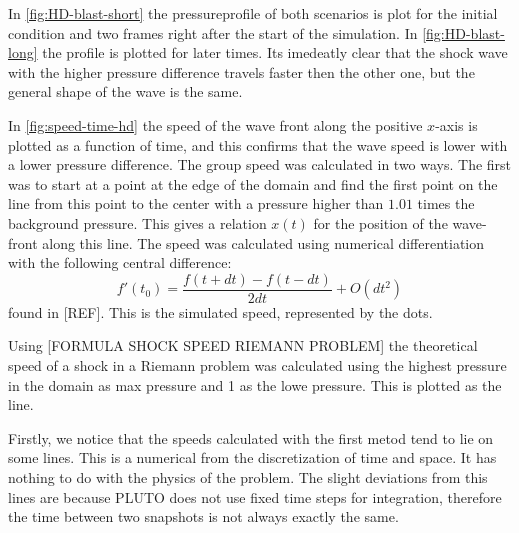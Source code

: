 In \cref{fig:HD-blast-short} the pressureprofile of both scenarios is plot for the initial condition and two frames right after the start of the simulation.
In \cref{fig:HD-blast-long} the profile is plotted for later times.
Its imedeatly clear that the shock wave with the higher pressure difference travels faster then the other one, but the general shape of the wave is the same.



In \cref{fig:speed-time-hd} the speed of the wave front along the positive $x$-axis is plotted as a function of time, and this confirms that the wave speed is lower with a lower pressure difference.
The group speed was calculated in two ways. The first was to start at a point at the edge of the domain and find the first point on the line from this point to the center with a pressure higher than $1.01$ times the background pressure.
This gives a relation $x(t)$ for the position of the wave-front along this line.
The speed was calculated using numerical differentiation with the following central difference:
\begin{equation*}
	f'(t_0) = \frac{f(t+dt)-f(t-dt)}{2dt} + O(dt^2)
\end{equation*}
found in [REF]. This is the simulated speed, represented by the dots. 

Using [FORMULA SHOCK SPEED RIEMANN PROBLEM]
the theoretical speed of a shock in a Riemann problem was calculated using the highest pressure in the domain as max pressure and 1 as the lowe pressure. This is plotted as the line.

Firstly, we notice that the speeds calculated with the first metod tend to lie on some lines. This is a numerical from the discretization of time and space. 
It has nothing to do with the physics of the problem. 
The slight deviations from this lines are because PLUTO does not use fixed time steps for integration, therefore the time between two snapshots is not always exactly the same.

